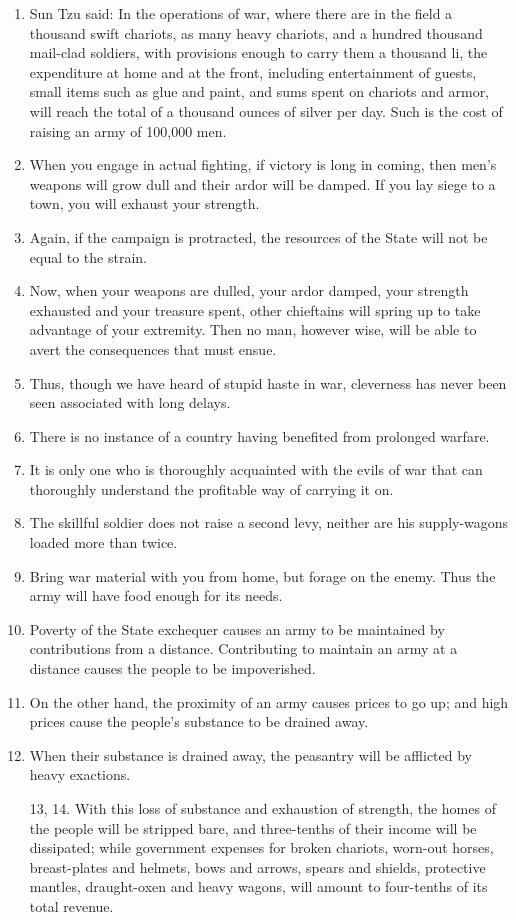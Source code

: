 \documentclass[oneside]{book}
\begin{document}
\begin{enumerate}
	\item Sun Tzu said: In the operations of war, where there are in the field a thousand swift chariots, as many heavy chariots, and a hundred thousand mail-clad soldiers, with provisions enough to carry them a thousand li, the expenditure at home and at the front, including entertainment of guests, small items such as glue and paint, and sums spent on chariots and armor, will reach the total of a thousand ounces of silver per day. Such is the cost of raising an army of 100,000 men.
	\item When you engage in actual fighting, if victory is long in coming, then men's weapons will grow dull and their ardor will be damped. If you lay siege to a town, you will exhaust your strength.
	\item Again, if the campaign is protracted, the resources of the State will not be equal to the strain.
	\item Now, when your weapons are dulled, your ardor damped, your strength exhausted and your treasure spent, other chieftains will spring up to take advantage of your extremity. Then no man, however wise, will be able to avert the consequences that must ensue.
	\item Thus, though we have heard of stupid haste in war, cleverness has never been seen associated with long delays.
	\item There is no instance of a country having benefited from prolonged warfare.
	\item It is only one who is thoroughly acquainted with the evils of war that can thoroughly understand the profitable way of carrying it on.
	\item The skillful soldier does not raise a second levy, neither are his supply-wagons loaded more than twice.
	\item Bring war material with you from home, but forage on the enemy. Thus the army will have food enough for its needs.
	\item Poverty of the State exchequer causes an army to be maintained by contributions from a distance. Contributing to maintain an army at a distance causes the people to be impoverished.
	\item On the other hand, the proximity of an army causes prices to go up; and high prices cause the people's substance to be drained away.
	\item When their substance is drained away, the peasantry will be afflicted by heavy exactions.
	\item[13, 14.] With this loss of substance and exhaustion of strength, the homes of the people will be stripped bare, and three-tenths of their income will be dissipated; while government expenses for broken chariots, worn-out horses, breast-plates and helmets, bows and arrows, spears and shields, protective mantles, draught-oxen and heavy wagons, will amount to four-tenths of its total revenue.

\end{enumerate}
\end{document}
